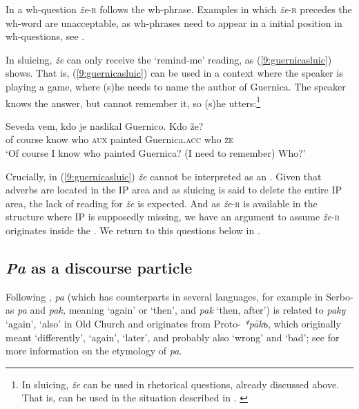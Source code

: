 \documentclass[output=paper,modfonts,newtxmath,hidelinks]{langscibook}
\begin{document}
\noindent In a wh-question \textit{že}-\textsc{r} follows the wh-phrase. Examples in which \textit{že}-\textsc{r} precedes the wh-word are unacceptable, as wh-phrases need to appear in a  initial position in  wh-questions, see \cite{mismas2016benj}. 

\z

\noindent In sluicing, \textit{že} can only receive the `remind-me' reading, as (\ref{9:guernicasluic}) shows. That is, (\ref{9:guernicasluic}) can be used in a context where the speaker is playing a game, where (s)he needs to name the author of Guernica. The speaker knows the answer, but cannot remember it, so (s)he utters:\footnote{In sluicing, \textit{že} can be used in rhetorical questions, already discussed above. That is,  can be used in the situation described in .
\label{9:zakajzefn}
\zlast}

\ea \label{9:guernicasluic}
\gll  Seveda vem, kdo je naslikal Guernico. Kdo že?\\
{of course} know who \textsc{aux} painted Guernica.\textsc{acc} who \textsc{že}\\
\glt `Of course I know who painted Guernica? (I need to remember) Who?'
\z

\noindent Crucially, in (\ref{9:guernicasluic}) \textit{že} cannot be interpreted as an  . Given that  adverbs are located in the IP area and as sluicing is said to delete the entire IP area, the lack of  reading for \textit{že} is expected. And as \textit{že}-\textsc{r} is available in the structure where IP is supposedly missing, we have an argument to assume \textit{že}-\textsc{r} originates inside the . We return to this questions below in . 


\subsection{\textit{Pa} as a discourse particle}

Following \cite{snoj2009}, \textit{pa} (which has counterparts in several  languages, for example in Serbo- as \textit{pa} and \textit{pak,} meaning `again' or `then', and  \textit{pak} `then, after') is related to \textit{paky} `again', `also' in Old Church  and originates from Proto- \textit{*pȃkъ}, which originally meant `differently', `again', `later', and probably also `wrong' and `bad'; see \cite{snoj2009} for more information on the etymology of \textit{pa}.
\end{document}
